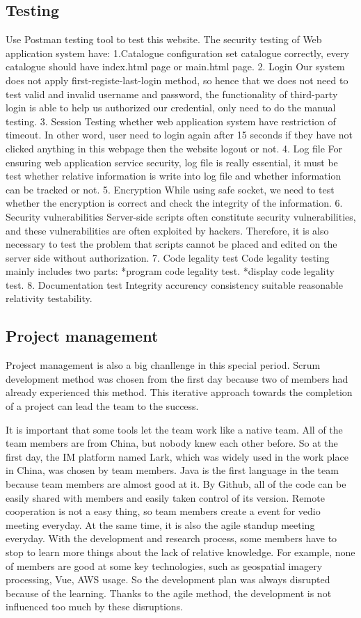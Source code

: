 \documentclass[conference]{IEEEtran}
\begin{document}
\subsection{Testing}
Use Postman testing tool to test this website. The security testing of Web application system have:
1.Catalogue configuration
set catalogue correctly, every catalogue should have index.html page or main.html page.
2. Login
Our system does not apply first-registe-last-login method, so hence that we does not need to test
valid and invalid username and password, the functionality of third-party login is able to help
us authorized our credential, only need to do the manual testing.
3. Session
Testing whether web application system have restriction of timeout. In other word, user need to
login again after 15 seconds if they have not clicked anything in this webpage then the website
logout or not.
4. Log file
For ensuring web application service security, log file is really essential, it must be test whether
relative information is write into log file and whether information can be tracked or not.
5. Encryption
While using safe socket, we need to test whether the encryption is correct and check the integrity
of the information.
6. Security vulnerabilities
Server-side scripts often constitute security vulnerabilities, and these vulnerabilities are often exploited by hackers.
Therefore, it is also necessary to test the problem that scripts cannot be placed and edited on the server side without authorization.
7. Code legality test
Code legality testing mainly includes two parts:
*program code legality test.
*display code legality test.
8. Documentation test
Integrity accurency consistency suitable reasonable relativity testability.
\subsection{Project management}

Project management is also a big chanllenge in this special period. Scrum development method was chosen from the first day because two of members
had already experienced this method. This iterative approach towards the completion of a project can lead the team to the success.

It is important that some tools let the team work like a native team. All of the team members are from China, but nobody knew each other before. 
So at the first day, the IM platform named Lark, which was widely used in the work place in China, was chosen by team members. Java is the first 
language in the team because team members are almost good at it. By Github, all of the code can be easily shared with members and easily taken 
control of its version. Remote cooperation is not a easy thing, so team members create a event for vedio meeting everyday. At the same time, it 
is also the agile standup meeting everyday. With the development and research process, some members have to stop to learn more things about the 
lack of relative knowledge. For example, none of members are good at some key technologies, such as geospatial imagery processing, Vue, AWS usage. 
So the development plan was always disrupted because of the learning. Thanks to the agile method, the development is not influenced too much by 
these disruptions. 
\end{document}
